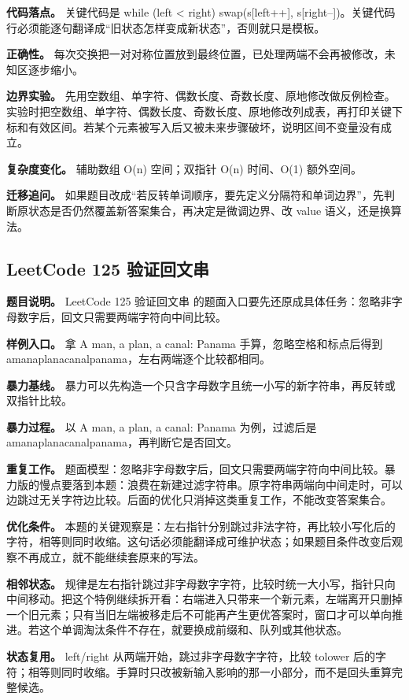 \textbf{代码落点。} 关键代码是 while (left < right) swap(s[left++], s[right--])。关键代码行必须能逐句翻译成“旧状态怎样变成新状态”，否则就只是模板。

\textbf{正确性。} 每次交换把一对对称位置放到最终位置，已处理两端不会再被修改，未知区逐步缩小。

\textbf{边界实验。} 先用空数组、单字符、偶数长度、奇数长度、原地修改做反例检查。实验时把空数组、单字符、偶数长度、奇数长度、原地修改列成表，再打印关键下标和有效区间。若某个元素被写入后又被未来步骤破坏，说明区间不变量没有成立。

\textbf{复杂度变化。} 辅助数组 O(n) 空间；双指针 O(n) 时间、O(1) 额外空间。

\textbf{迁移追问。} 如果题目改成“若反转单词顺序，要先定义分隔符和单词边界”，先判断原状态是否仍然覆盖新答案集合，再决定是微调边界、改 value 语义，还是换算法。

\subsection{LeetCode 125 验证回文串}

\textbf{题目说明。} LeetCode 125 验证回文串 的题面入口要先还原成具体任务：忽略非字母数字后，回文只需要两端字符向中间比较。

\textbf{样例入口。} 拿 A man, a plan, a canal: Panama 手算，忽略空格和标点后得到 amanaplanacanalpanama，左右两端逐个比较都相同。

\textbf{暴力基线。} 暴力可以先构造一个只含字母数字且统一小写的新字符串，再反转或双指针比较。

\textbf{暴力过程。} 以 A man, a plan, a canal: Panama 为例，过滤后是 amanaplanacanalpanama，再判断它是否回文。

\textbf{重复工作。} 题面模型：忽略非字母数字后，回文只需要两端字符向中间比较。暴力版的慢点要落到本题：浪费在新建过滤字符串。原字符串两端向中间走时，可以边跳过无关字符边比较。后面的优化只消掉这类重复工作，不能改变答案集合。

\textbf{优化条件。} 本题的关键观察是：左右指针分别跳过非法字符，再比较小写化后的字符，相等则同时收缩。这句话必须能翻译成可维护状态；如果题目条件改变后观察不再成立，就不能继续套原来的写法。

\textbf{相邻状态。} 规律是左右指针跳过非字母数字字符，比较时统一大小写，指针只向中间移动。把这个特例继续拆开看：右端进入只带来一个新元素，左端离开只删掉一个旧元素；只有当旧左端被移走后不可能再产生更优答案时，窗口才可以单向推进。若这个单调淘汰条件不存在，就要换成前缀和、队列或其他状态。

\textbf{状态复用。} left/right 从两端开始，跳过非字母数字字符，比较 tolower 后的字符；相等则同时收缩。手算时只改被新输入影响的那一小部分，而不是回头重算完整候选。

